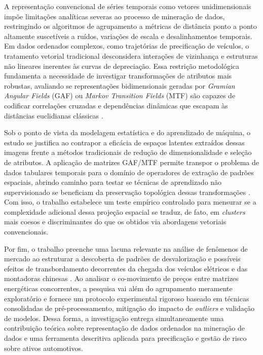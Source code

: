 \documentclass{article}
\begin{document}
A representação convencional de séries temporais como vetores unidimensionais impõe limitações analíticas severas ao processo de mineração de dados, restringindo os algoritmos de agrupamento a métricas de distância ponto a ponto altamente suscetíveis a ruídos, variações de escala e desalinhamentos temporais. Em dados ordenados complexos, como trajetórias de precificação de veículos, o tratamento vetorial tradicional desconsidera interações de vizinhança e estruturas não lineares inerentes às curvas de depreciação. Essa restrição metodológica fundamenta a necessidade de investigar transformações de atributos mais robustas, avaliando se representações bidimensionais geradas por \textit{Gramian Angular Fields} (GAF) ou \textit{Markov Transition Fields} (MTF) são capazes de codificar correlações cruzadas e dependências dinâmicas que escapam às distâncias euclidianas clássicas \cite{wu2023imaging, ulyanin2019feature}.

Sob o ponto de vista da modelagem estatística e do aprendizado de máquina, o estudo se justifica ao contrapor a eficácia de espaços latentes extraídos dessas imagens frente a métodos tradicionais de redução de dimensionalidade e seleção de atributos. A aplicação de matrizes GAF/MTF permite transpor o problema de dados tabulares temporais para o domínio de operadores de extração de padrões espaciais, abrindo caminho para testar se técnicas de aprendizado não supervisionado se beneficiam da preservação topológica dessas transformações \cite{jueco2024performance}. Com isso, o trabalho estabelece um teste empírico controlado para mensurar se a complexidade adicional dessa projeção espacial se traduz, de fato, em \textit{clusters} mais coesos e discriminantes do que os obtidos via abordagens vetoriais convencionais.

Por fim, o trabalho preenche uma lacuna relevante na análise de fenômenos de mercado ao estruturar a descoberta de padrões de desvalorização e possíveis efeitos de transbordamento decorrentes da chegada dos veículos elétricos e das montadoras chinesas \cite{li2025rise, abrardi2026market}. Ao analisar o co-movimento de preços entre matrizes energéticas concorrentes, a pesquisa vai além do agrupamento meramente exploratório e fornece um protocolo experimental rigoroso baseado em técnicas consolidadas de pré-processamento, mitigação do impacto de \textit{outliers} e validação de modelos. Dessa forma, a investigação entrega simultaneamente uma contribuição teórica sobre representação de dados ordenados na mineração de dados e uma ferramenta descritiva aplicada para precificação e gestão de risco sobre ativos automotivos.
\end{document}
